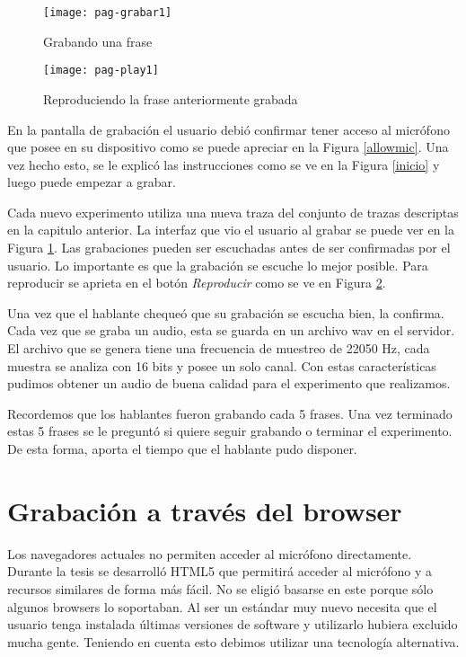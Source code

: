 \begin{figure}[h!]
    \centerline{\texttt{[image: pag-grabar1]} }
    \caption{Grabando una frase}
    \label{grabando}
\end{figure}

\begin{figure}[h!]
    \centerline{\texttt{[image: pag-play1]} }
    \caption{Reproduciendo la frase anteriormente grabada}
    \label{reproduciendo}
\end{figure}

En la pantalla de grabación el usuario debió confirmar tener acceso al micrófono que posee en su dispositivo como se puede apreciar en la Figura \ref{allowmic}. Una vez hecho esto, se le explicó las instrucciones como se ve en la Figura \ref{inicio} y luego puede empezar a grabar. 

Cada nuevo experimento utiliza una nueva traza del conjunto de trazas descriptas en la capitulo anterior. La interfaz que vio el usuario al grabar se puede ver en la Figura \ref{grabando}. Las grabaciones pueden ser escuchadas antes de ser confirmadas por el usuario. Lo importante es que la grabación se escuche lo mejor posible. Para reproducir se aprieta en el botón \textit{Reproducir} como se ve en Figura \ref{reproduciendo}. 

Una vez que el hablante chequeó que su grabación se escucha bien, la confirma. Cada vez que se graba un audio, esta se guarda en un archivo wav en el servidor. El archivo que se genera tiene una frecuencia de muestreo de 22050 Hz, cada muestra se analiza con 16 bits y posee un solo canal. Con estas características pudimos obtener un audio de buena calidad para el experimento que realizamos.

Recordemos que los hablantes fueron grabando cada 5 frases. Una vez terminado estas 5 frases se le preguntó si quiere seguir grabando o terminar el experimento. De esta forma, aporta el tiempo que el hablante pudo disponer.

\section{Grabación a través del browser}

Los navegadores actuales no permiten acceder al micrófono directamente. Durante la tesis se desarrolló HTML5 que permitirá acceder al micrófono y a recursos similares de forma más fácil. No se eligió basarse en este porque sólo algunos browsers lo soportaban. Al ser un estándar muy nuevo necesita que el usuario tenga instalada últimas versiones de software y utilizarlo hubiera excluido mucha gente. Teniendo en cuenta esto debimos utilizar una tecnología alternativa. 

